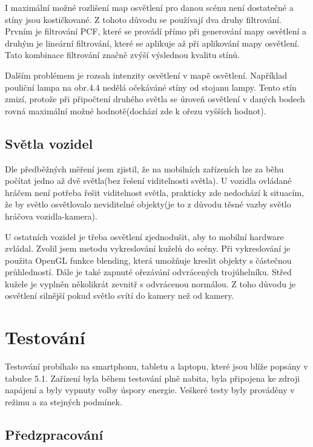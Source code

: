 \documentclass[11pt,twoside,a4paper]{book}
\begin{document}
I maximální možné rozlišení map osvětlení pro danou scénu není dostatečné a stíny jsou kostičkované. Z tohoto důvodu se používají dva druhy filtrování. Prvním je filtrování PCF, které se provádí přímo při generování mapy osvětlení a druhým je lineární filtrování, které se aplikuje až při aplikování mapy osvětlení. Tato kombinace filtrování značně zvýší výslednou kvalitu stínů.

Dalším problémem je rozsah intenzity osvětlení v mapě osvětlení. Například pouliční lampa na obr.4.4 nedělá očekáváné stíny od stojanu lampy. Tento stín zmizí, protože při připočtení druhého světla se úroveň osvětlení v daných bodech rovná maximální možné hodnotě(dochází zde k ořezu vyšších hodnot).

\section{Světla vozidel}

Dle předběžných měření jsem zjistil, že na mobilních zařízeních lze za běhu počítat jedno až dvě světla(bez řešení viditelnosti světla). U vozidla ovládané hráčem není potřeba řešit viditelnost světla, prakticky zde nedochází k situacím, že by světlo osvětlovalo neviditelné objekty(je to z důvodu těsné vazby světlo hráčova vozidla-kamera).

U ostatních vozidel je třeba osvětlení zjednodušit, aby to mobilní hardware zvládal. Zvolil jsem metodu vykreslování kuželů do scény. Při vykreslování je použita OpenGL funkce blending, která umožňuje kreslit objekty s částečnou průhledností. Dále je také zapnuté ořezávání odvrácených trojúhelníku. Střed kužele je vyplněn několikrát zevnitř s odvrácenou normálou. Z toho důvodu je osvětlení silnější pokud světlo svítí do kamery než od kamery.

\chapter{Testování}
Testování probíhalo na smartphonu, tabletu a laptopu, které jsou blíže popsány v tabulce 5.1. Zařízení byla během testování plně nabita, byla připojena ke zdroji napájení a byly vypnuty volby úspory energie. Veškeré testy byly prováděny v režimu  a za stejných podmínek.

\section{Předzpracování}
\end{document}
